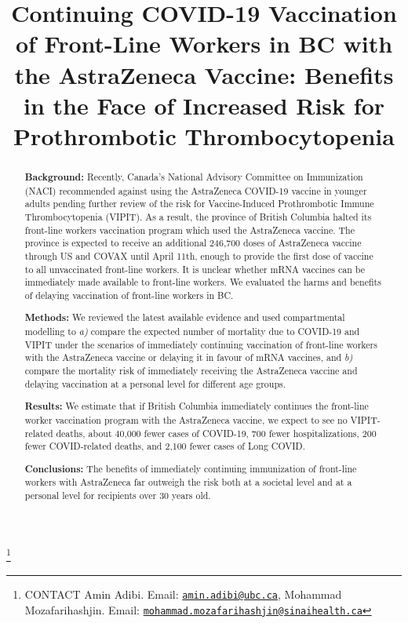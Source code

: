 \documentclass[]{interact}
\theoremstyle{plain}%
\theoremstyle{definition}
\theoremstyle{remark}
\begin{document}

\title{Continuing COVID-19 Vaccination of Front-Line Workers in BC with
the AstraZeneca Vaccine: Benefits in the Face of Increased Risk for
Prothrombotic Thrombocytopenia}


\author{
}

\thanks{CONTACT Amin
Adibi. Email: \href{mailto:amin.adibi@ubc.ca}{\nolinkurl{amin.adibi@ubc.ca}}, Mohammad
Mozafarihashjin. Email: \href{mailto:mohammad.mozafarihashjin@sinaihealth.ca}{\nolinkurl{mohammad.mozafarihashjin@sinaihealth.ca}}}

\maketitle

\begin{abstract}
\textbf{Background:} Recently, Canada's National Advisory Committee on
Immunization (NACI) recommended against using the AstraZeneca COVID-19
vaccine in younger adults pending further review of the risk for
Vaccine-Induced Prothrombotic Immune Thrombocytopenia (VIPIT). As a
result, the province of British Columbia halted its front-line workers
vaccination program which used the AstraZeneca vaccine. The province is
expected to receive an additional 246,700 doses of AstraZeneca vaccine
through US and COVAX until April 11th, enough to provide the first dose
of vaccine to all unvaccinated front-line workers. It is unclear whether
mRNA vaccines can be immediately made available to front-line workers.
We evaluated the harms and benefits of delaying vaccination of
front-line workers in BC.

\textbf{Methods:} We reviewed the latest available evidence and used
compartmental modelling to \emph{a)} compare the expected number of
mortality due to COVID-19 and VIPIT under the scenarios of immediately
continuing vaccination of front-line workers with the AstraZeneca
vaccine or delaying it in favour of mRNA vaccines, and \emph{b)} compare
the mortality risk of immediately receiving the AstraZeneca vaccine and
delaying vaccination at a personal level for different age groups.

\textbf{Results:} We estimate that if British Columbia immediately
continues the front-line worker vaccination program with the AstraZeneca
vaccine, we expect to see no VIPIT-related deaths, about 40,000 fewer
cases of COVID-19, 700 fewer hospitalizations, 200 fewer COVID-related
deaths, and 2,100 fewer cases of Long COVID.

\textbf{Conclusions:} The benefits of immediately continuing
immunization of front-line workers with AstraZeneca far outweigh the
risk both at a societal level and at a personal level for recipients
over 30 years old.
\end{abstract}
\end{document}
